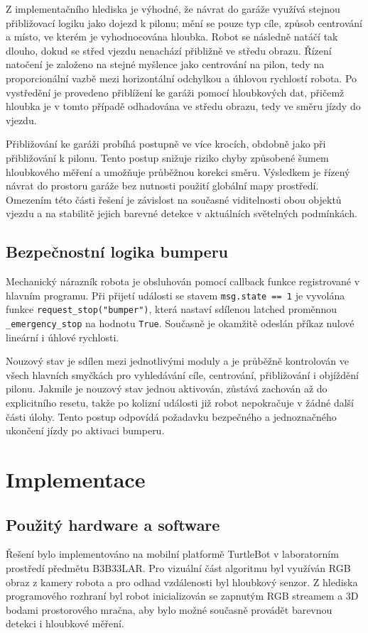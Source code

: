 \documentclass[a4paper,11pt]{article}
\begin{document}
Z implementačního hlediska je výhodné, že návrat do garáže využívá stejnou přibližovací logiku jako dojezd k pilonu; mění se pouze typ cíle, způsob centrování a místo, ve kterém je vyhodnocována hloubka. Robot se následně natáčí tak dlouho, dokud se střed vjezdu nenachází přibližně ve středu obrazu. Řízení natočení je založeno na stejné myšlence jako centrování na pilon, tedy na proporcionální vazbě mezi horizontální odchylkou a úhlovou rychlostí robota. Po vystředění je provedeno přiblížení ke garáži pomocí hloubkových dat, přičemž hloubka je v tomto případě odhadována ve středu obrazu, tedy ve směru jízdy do vjezdu.

Přibližování ke garáži probíhá postupně ve více krocích, obdobně jako při přibližování k pilonu. Tento postup snižuje riziko chyby způsobené šumem hloubkového měření a umožňuje průběžnou korekci směru. Výsledkem je řízený návrat do prostoru garáže bez nutnosti použití globální mapy prostředí. Omezením této části řešení je závislost na současné viditelnosti obou objektů vjezdu a na stabilitě jejich barevné detekce v aktuálních světelných podmínkách.

\subsection{Bezpečnostní logika bumperu}
Mechanický nárazník robota je obsluhován pomocí callback funkce registrované v hlavním programu. Při přijetí události se stavem \texttt{msg.state == 1} je vyvolána funkce \texttt{request\_stop("bumper")}, která nastaví sdílenou latched proměnnou \texttt{\_emergency\_stop} na hodnotu \texttt{True}. Současně je okamžitě odeslán příkaz nulové lineární i úhlové rychlosti.

Nouzový stav je sdílen mezi jednotlivými moduly a je průběžně kontrolován ve všech hlavních smyčkách pro vyhledávání cíle, centrování, přibližování i objíždění pilonu. Jakmile je nouzový stav jednou aktivován, zůstává zachován až do explicitního resetu, takže po kolizní události již robot nepokračuje v žádné další části úlohy. Tento postup odpovídá požadavku bezpečného a jednoznačného ukončení jízdy po aktivaci bumperu.

\section{Implementace}

\subsection{Použitý hardware a software}
Řešení bylo implementováno na mobilní platformě TurtleBot v laboratorním prostředí předmětu B3B33LAR. Pro vizuální část algoritmu byl využíván RGB obraz z kamery robota a pro odhad vzdálenosti byl hloubkový senzor. Z hlediska programového rozhraní byl robot inicializován se zapnutým RGB streamem a 3D bodami prostorového mračna, aby bylo možné současně provádět barevnou detekci i hloubkové měření.
\end{document}
